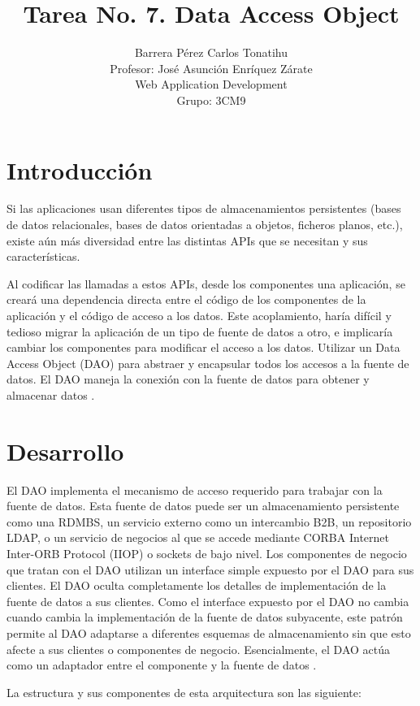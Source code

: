 \documentclass[a4paper,12pt]{article}
\title{Tarea No. 7. Data Access Object}
\author{Barrera Pérez Carlos Tonatihu \\ Profesor: José Asunción Enríquez 
Zárate 
\\ Web Application Development \\ Grupo: 3CM9 }
\begin{document}
\maketitle
\newpage
\tableofcontents
\newpage

\section{Introducción}
Si  las aplicaciones usan diferentes tipos de almacenamientos persistentes 
(bases de datos relacionales, bases de datos orientadas a objetos, ficheros 
planos, etc.), existe aún más diversidad entre las distintas APIs que se 
necesitan y sus características.

Al codificar las llamadas a estos APIs, desde los componentes una aplicación, se 
creará una dependencia directa entre el código de los componentes de la 
aplicación y el código de acceso a los datos. Este acoplamiento, haría difícil y 
tedioso migrar la aplicación de un tipo de fuente de datos a otro, e implicaría 
cambiar los componentes para modificar el acceso a los datos.
Utilizar un Data Access Object (DAO) para abstraer y encapsular todos los 
accesos a la fuente de datos. El DAO maneja la conexión con la fuente de datos 
para obtener y almacenar datos \cite{oracle}. 

\section{Desarrollo}
El DAO implementa el mecanismo de acceso requerido para trabajar con la fuente 
de datos. Esta fuente de datos puede ser un almacenamiento persistente como una 
RDMBS, un servicio externo como un intercambio B2B, un repositorio LDAP, o un 
servicio de negocios al que se accede mediante CORBA Internet Inter-ORB Protocol 
(IIOP) o sockets de bajo nivel. Los componentes de negocio que tratan con el DAO 
utilizan un interface simple expuesto por el DAO para sus clientes. El DAO 
oculta completamente los detalles de implementación de la fuente de datos a sus 
clientes. Como el interface expuesto por el DAO no cambia cuando cambia la 
implementación de la fuente de datos subyacente, este patrón permite al DAO 
adaptarse a diferentes esquemas de almacenamiento sin que esto afecte a sus 
clientes o componentes de negocio. Esencialmente, el DAO actúa como un adaptador 
entre el componente y la fuente de datos \cite{geek}.

La estructura y sus componentes de esta arquitectura son las siguiente:
\end{document}
